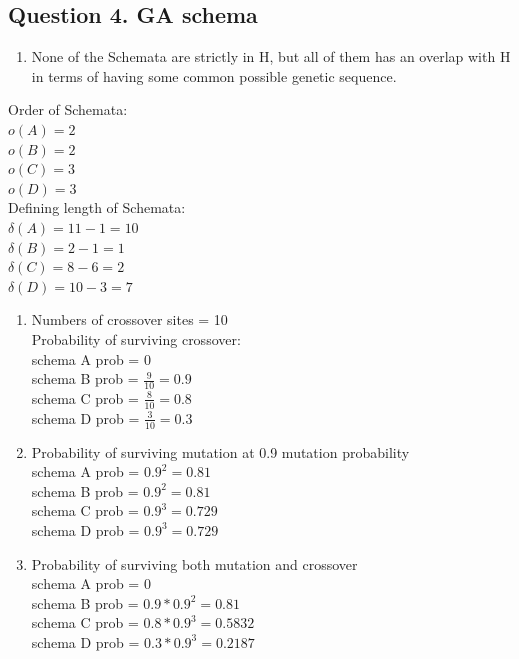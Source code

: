 \documentclass[11pt]{article}
\providecommand{\tightlist}{%
      \setlength{\itemsep}{0pt}\setlength{\parskip}{0pt}}
\begin{document}
    \subsection*{Question 4. GA schema}\label{question-4.-ga-schema}

\begin{enumerate}
\def\labelenumi{\alph{enumi})}
\tightlist
\item
  None of the Schemata are strictly in H, but all of them has an overlap
  with H in terms of having some common possible genetic sequence. 
\end{enumerate}

Order of Schemata: \\
\(o(A) = 2\) \\
\(o(B) = 2\) \\
\(o(C) = 3\) \\
\(o(D) = 3\)\\

Defining length of Schemata: \\
$\delta(A) = 11-1 = 10 $ \\
$\delta(B) =2-1 = 1 $ \\
$\delta(C) = 8-6 = 2 $\\
 $\delta(D) = 10-3 = 7 $ \\

\begin{enumerate}
\def\labelenumi{\alph{enumi})}
\setcounter{enumi}{1}
\item
  Numbers of crossover sites = 10 \\
  Probability of surviving crossover:\\
  schema A prob = 0 \\
  schema B prob = \(\frac{9}{10} = 0.9\)\\
   schema C prob  = \(\frac{8}{10} = 0.8\) \\
   schema D prob = \(\frac{3}{10} = 0.3\) 

\item
  Probability of surviving mutation at 0.9 mutation probability \\
  schema A  prob = \(0.9^2 = 0.81\) \\
  schema B prob = \(0.9^2 = 0.81\) \\
  schema C prob  = \(0.9^3 = 0.729\) \\
  schema D prob = \(0.9^3 = 0.729\) 
\item
  Probability of surviving both mutation and crossover \\
  schema A prob =  \(0\) \\
  schema B prob = \(0.9 * 0.9^2 = 0.81\) \\
  schema C prob =  \(0.8 * 0.9^3 = 0.5832\) \\
  schema D prob = \(0.3 * 0.9^3 = 0.2187\) 
\end{enumerate}


    
    
    
    
\end{document}
